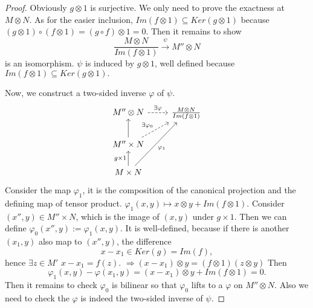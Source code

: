 \documentclass[11pt]{article}
\newcommand{\Lrta}{\Longrightarrow}
\newcommand{\lrta}{\longrightarrow}
\begin{document}
\begin{proof}
Obviously $g\otimes 1$ is surjective. We only need to prove the exactness at $M\otimes N$. As for the easier inclusion,
$
Im(f\otimes 1)\subseteq Ker(g\otimes 1)
$
because $(g\otimes 1)\circ (f\otimes 1)=(g\circ f)\otimes 1=0$. 
Then it remains to show 
$$
\frac{M\otimes N}{Im(f\otimes 1)}\overset{\psi}{\lrta}M''\otimes N
$$
is an isomorphism. $\psi $ is induced by $g\otimes 1$,  well defined because $
Im(f\otimes 1)\subseteq Ker(g\otimes 1).
$

Now, we construct a two-sided inverse $\varphi$ of $\psi$.
\[
\begin{tikzcd}
 M''\otimes N  \ar[r,dashed,"\exists \varphi"] & \frac{M\otimes N}{Im(f\otimes 1)} \\
 M''\times N \arrow[u] \arrow[ur,dashed,"\exists \varphi_0"]& \\
M\times N\arrow[swap,uur,"\varphi_1"]\arrow[u,"g\times 1"] &    
\end{tikzcd}
\] 
Consider the map $\varphi_1$, it is the composition of the canonical projection and the defining map of tensor product.
$\varphi_1(x,y)\mapsto x\otimes y+Im(f\otimes 1)$. Consider $(x'',y)\in M''\times N$, which is the image of $(x,y)$ under $g\times 1$. Then we can define $\varphi_0(x'',y):=\varphi_1(x,y)$. It is well-defined, because if there is another $(x_1,y)$ also map to $(x'',y)$, the difference
$$
x-x_1\in Ker(g)=Im(f),
$$
hence $\exists z\in M'$
$x-x_1=f(z)$.
$\Lrta (x-x_1)\otimes y=(f\otimes 1)(z\otimes y)$
Then
$$
\varphi_1(x,y)-\varphi(x_1,y)=(x-x_1)\otimes y+Im(f\otimes 1)=0.
$$
Then it remains to check $\varphi_0$ is bilinear so that $\varphi_0$ lifts to a $\varphi$ on $M''\otimes N$. Also we  need to check the $\varphi$ is indeed the two-sided inverse of $\psi$.


\end{proof}
\end{document}
